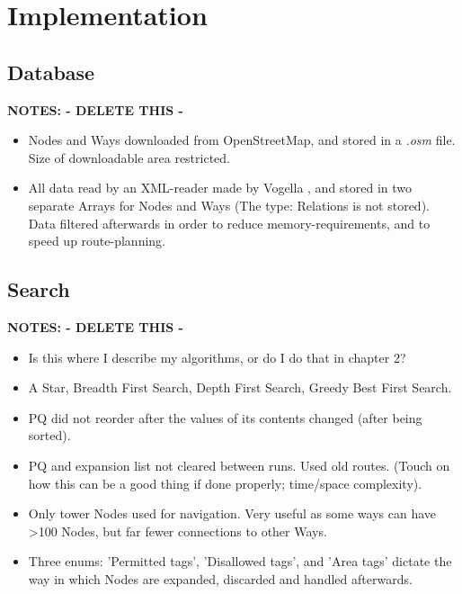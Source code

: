 \chapter{Implementation}




\section{Database}
\textbf{NOTES: - DELETE THIS -}
\begin{itemize}
	\item Nodes and Ways downloaded from OpenStreetMap\cite{OSM}, and stored in a \textit{.osm} file. Size of downloadable area restricted.
	\item All data read by an XML-reader made by Vogella \cite{Vogella-XML}, and stored in two separate Arrays for Nodes and Ways (The type: Relations is not stored). Data filtered afterwards in order to reduce memory-requirements, and to speed up route-planning.
\end{itemize}



\section{Search}
\textbf{NOTES: - DELETE THIS -}
\begin{itemize}
	\item Is this where I describe my algorithms, or do I do that in chapter 2?
	\item A Star, Breadth First Search, Depth First Search, Greedy Best First Search.
	\item PQ did not reorder after the values of its contents changed (after being sorted).
	\item PQ and expansion list not cleared between runs. Used old routes. (Touch on how this can be a good thing if done properly; time/space complexity).
	\item Only tower Nodes used for navigation. Very useful as some ways can have >100 Nodes, but far fewer connections to other Ways.
	\item Three enums: 'Permitted tags', 'Disallowed tags', and 'Area tags' dictate the way in which Nodes are expanded, discarded and handled afterwards.
\end{itemize}


